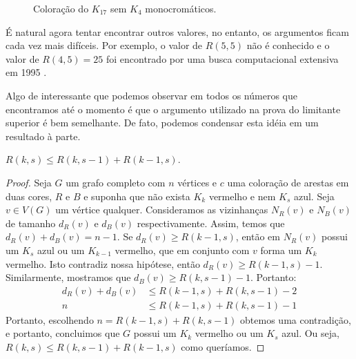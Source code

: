 
\begin{figure}[ht!]
\label{fig:exr44}
\centering
{}
\caption{Coloração do $K_{17}$ sem $K_4$ monocromáticos.}
\end{figure}

É natural agora tentar encontrar outros valores, no entanto, os argumentos ficam cada vez mais difíceis. Por exemplo, o valor de $R(5,5)$ não é conhecido e o valor de $R(4,5) = 25$ foi encontrado por uma busca computacional extensiva em 1995 \cite{rad45}.

Algo de interessante que podemos observar em todos os números que encontramos até o momento é que o argumento utilizado na prova do limitante superior é bem semelhante. De fato, podemos condensar esta idéia em um resultado à parte.

\begin{theorem}
\label{thm:inequality}
$R(k,s) \leq R(k,s-1) + R(k-1,s)$.
\end{theorem}
\begin{proof}
Seja $G$ um grafo completo com $n$ vértices e $c$ uma coloração de arestas em duas cores, $R$ e $B$ e suponha que não exista $K_k$ vermelho e nem $K_s$ azul. Seja $v \in V(G)$ um vértice qualquer. Consideramos as vizinhanças $N_R(v)$ e $N_B(v)$ de tamanho $d_R(v)$ e $d_B(v)$ respectivamente. Assim, temos que $d_R(v) + d_B(v) = n-1$. Se $d_R(v) \geq R(k-1,s)$, então em $N_R(v)$ possui um $K_s$ azul ou um $K_{k-1}$ vermelho, que em conjunto com $v$ forma um $K_k$ vermelho. Isto contradiz nossa hipótese, então $d_R(v) \geq R(k-1,s) - 1$. Similarmente, mostramos que $d_B(v) \geq R(k,s-1) - 1$. Portanto:
\begin{align*}
d_R(v) + d_B(v) &\leq R(k-1,s) + R(k,s-1) - 2 \\
n &\leq R(k-1,s) + R(k,s-1) - 1
\end{align*}
Portanto, escolhendo $n = R(k-1,s) + R(k,s-1)$ obtemos uma contradição, e portanto, concluimos que $G$ possui um $K_k$ vermelho ou um $K_s$ azul. Ou seja, $R(k,s) \leq R(k,s-1) + R(k-1,s)$ como queríamos.
\end{proof}

